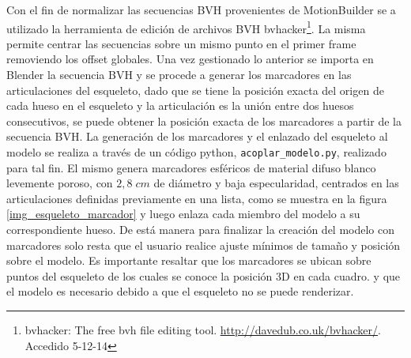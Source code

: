 Con el fin de normalizar las secuencias BVH provenientes de MotionBuilder se a utilizado la herramienta de edición de archivos BVH bvhacker\footnote{bvhacker: The free bvh file editing tool. \textcolor{blue}{\underline{\url{ http://davedub.co.uk/bvhacker/}}}. Accedido 5-12-14}. La misma permite centrar las secuencias sobre un mismo punto en el primer frame  removiendo los offset globales.
 Una vez gestionado lo anterior se importa en Blender la secuencia BVH y se procede a generar los marcadores en las articulaciones del esqueleto, dado que se tiene la posición exacta del origen de cada hueso en el esqueleto y la articulación es la unión entre dos huesos consecutivos, se puede obtener la posición exacta de los marcadores a partir de la secuencia BVH.
 La generación de los marcadores y el enlazado del esqueleto al modelo se realiza a través de un código python, \texttt{acoplar\_modelo.py}, realizado para tal fin. El mismo genera marcadores esféricos de material difuso blanco levemente poroso, con $2,8 \;cm$ de diámetro y baja especularidad, centrados en las articulaciones definidas previamente en una lista, como se muestra en la figura \ref{img_esqueleto_marcador} y luego enlaza cada miembro del modelo a su correspondiente hueso. De está manera para finalizar la creación del modelo con marcadores solo resta que el usuario realice ajuste mínimos de tamaño y posición sobre el modelo. Es importante resaltar que los marcadores se ubican sobre puntos del esqueleto de los cuales se conoce la posición 3D en cada cuadro. y que el modelo es necesario debido a que el esqueleto no se puede renderizar. 
 
